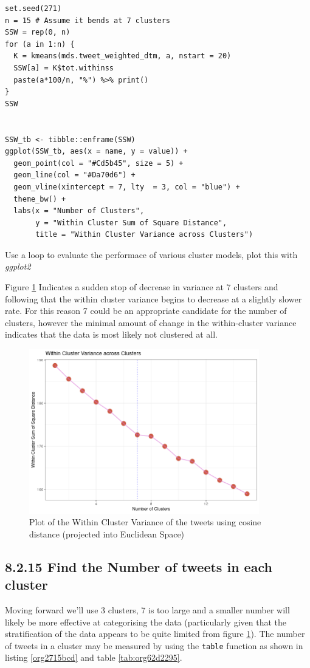 \documentclass[11pt]{article}
\begin{document}
\begin{listing}[htbp]
\begin{verbatim}
set.seed(271)
n = 15 # Assume it bends at 7 clusters
SSW = rep(0, n)
for (a in 1:n) {
  K = kmeans(mds.tweet_weighted_dtm, a, nstart = 20)
  SSW[a] = K$tot.withinss
  paste(a*100/n, "%") %>% print()
}
SSW


SSW_tb <- tibble::enframe(SSW)
ggplot(SSW_tb, aes(x = name, y = value)) +
  geom_point(col = "#Cd5b45", size = 5) +
  geom_line(col = "#Da70d6") +
  geom_vline(xintercept = 7, lty  = 3, col = "blue") +
  theme_bw() +
  labs(x = "Number of Clusters",
       y = "Within Cluster Sum of Square Distance",
       title = "Within Cluster Variance across Clusters")
\end{verbatim}
\caption{\label{orgd972d90}Use a loop to evaluate the performace of various cluster models, plot this with \emph{ggplot2}}
\end{listing}

Figure \ref{fig:org1ec920b} Indicates a sudden stop of decrease in variance at 7 clusters and following that the within cluster variance begins to decrease at a slightly slower rate. For this reason 7 could be an appropriate candidate for the number of clusters, however the minimal amount of change in the within-cluster variance indicates that the data is most likely not clustered at all.


\begin{figure}[htbp]
\centering
\includegraphics[width=10cm]{./Figures/Q14WithinClusterVariance.png}
\caption{\label{fig:org1ec920b}Plot of the Within Cluster Variance of the tweets using cosine distance (projected into Euclidean Space)}
\end{figure}

\subsection{8.2.15 Find the Number of tweets in each cluster}
\label{sec:org8d6c4d3}
Moving forward we'll use 3 clusters, 7 is too large and a smaller number will likely be more effective at categorising the data (particularly given that the stratification of the data appears to be quite limited from figure \ref{fig:org1ec920b}). The number of tweets in a cluster may be measured by using the \texttt{table} function as shown in listing \ref{org2715bcd} and table \ref{tab:org62d2295}.
\end{document}
